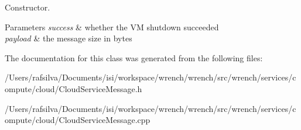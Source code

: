 Constructor. 


\begin{DoxyParams}{Parameters}
{\em success} & whether the VM shutdown succeeded \\
\hline
{\em payload} & the message size in bytes \\
\hline
\end{DoxyParams}


The documentation for this class was generated from the following files\+:\begin{DoxyCompactItemize}
\item 
/\+Users/rafsilva/\+Documents/isi/workspace/wrench/wrench/src/wrench/services/compute/cloud/Cloud\+Service\+Message.\+h\item 
/\+Users/rafsilva/\+Documents/isi/workspace/wrench/wrench/src/wrench/services/compute/cloud/Cloud\+Service\+Message.\+cpp\end{DoxyCompactItemize}
